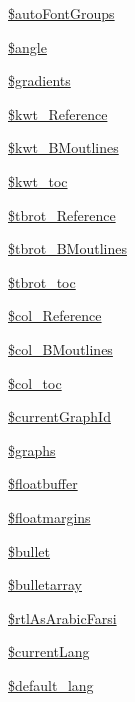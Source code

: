 \begin{DoxyCompactItemize}
\item 
\hyperlink{classm_p_d_f_a52a729df1c406f3879651cdf5d056a89}{\$auto\-Font\-Groups}
\item 
\hyperlink{classm_p_d_f_a31b316849f1604f55b97f8b75d5dba09}{\$angle}
\item 
\hyperlink{classm_p_d_f_a84dfb59af1002e74d2339934daac21e3}{\$gradients}
\item 
\hyperlink{classm_p_d_f_a7760ed025e6f8a1a5e45ccdf0d3da0c8}{\$kwt\-\_\-\-Reference}
\item 
\hyperlink{classm_p_d_f_a6b7aa4c37bed5d47755f2b08ded822a6}{\$kwt\-\_\-\-B\-Moutlines}
\item 
\hyperlink{classm_p_d_f_af879629d74fb9a16be61f6dddb84c102}{\$kwt\-\_\-toc}
\item 
\hyperlink{classm_p_d_f_ab1e3e40b1f862eb7cc6f3c2c1c1ccbd5}{\$tbrot\-\_\-\-Reference}
\item 
\hyperlink{classm_p_d_f_a461839c2fac18376aa57b3e1c5a6ff72}{\$tbrot\-\_\-\-B\-Moutlines}
\item 
\hyperlink{classm_p_d_f_a66608b12b203b0705ac3cb26552f2887}{\$tbrot\-\_\-toc}
\item 
\hyperlink{classm_p_d_f_af2a34060d4176afc993afa177ee48c0c}{\$col\-\_\-\-Reference}
\item 
\hyperlink{classm_p_d_f_a708a9e1f841baab8c877d74b81e3d6c9}{\$col\-\_\-\-B\-Moutlines}
\item 
\hyperlink{classm_p_d_f_a50b0936fccbc37260fe1366275aa6049}{\$col\-\_\-toc}
\item 
\hyperlink{classm_p_d_f_a184bfad25a884f52e1f95dce3d1af9e1}{\$current\-Graph\-Id}
\item 
\hyperlink{classm_p_d_f_a17bf0c0f0705d52108cb9a380109aae4}{\$graphs}
\item 
\hyperlink{classm_p_d_f_a5dc8d83cce11b132790db030106f33ab}{\$floatbuffer}
\item 
\hyperlink{classm_p_d_f_ab21bb984d9fc855a0077b9b68a371541}{\$floatmargins}
\item 
\hyperlink{classm_p_d_f_adfef9b11fb49b034b1cd420fb6c13d78}{\$bullet}
\item 
\hyperlink{classm_p_d_f_aa7a350f64478df33ae5165750fd7863c}{\$bulletarray}
\item 
\hyperlink{classm_p_d_f_a55a8a2ed6cb3882f3d81bfcb2a280af0}{\$rtl\-As\-Arabic\-Farsi}
\item 
\hyperlink{classm_p_d_f_a72a159c92a387b10f7da9703b9db59f5}{\$current\-Lang}
\item 
\hyperlink{classm_p_d_f_a93e7a96e98535752c4a59f68b351f6dd}{\$default\-\_\-lang}

\end{DoxyCompactItemize}

